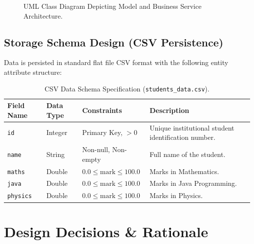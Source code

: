 \documentclass[12pt,a4paper]{report}
\begin{document}
\begin{figure}[htbp]
\caption{UML Class Diagram Depicting Model and Business Service Architecture.}
\end{figure}

\section{Storage Schema Design (CSV Persistence)}
Data is persisted in standard flat file CSV format with the following entity attribute structure:
\begin{table}[htbp]
\centering
\begin{tabularx}{\textwidth}{l l l X}
\toprule
\textbf{Field Name} & \textbf{Data Type} & \textbf{Constraints} & \textbf{Description} \\
\midrule
\texttt{id} & Integer & Primary Key, $>0$ & Unique institutional student identification number. \\
\texttt{name} & String & Non-null, Non-empty & Full name of the student. \\
\texttt{maths} & Double & $0.0 \le \text{mark} \le 100.0$ & Marks in Mathematics. \\
\texttt{java} & Double & $0.0 \le \text{mark} \le 100.0$ & Marks in Java Programming. \\
\texttt{physics} & Double & $0.0 \le \text{mark} \le 100.0$ & Marks in Physics. \\
\bottomrule
\end{tabularx}
\caption{CSV Data Schema Specification (\texttt{students\_data.csv}).}
\end{table}

\chapter{Design Decisions \& Rationale}
\end{document}
